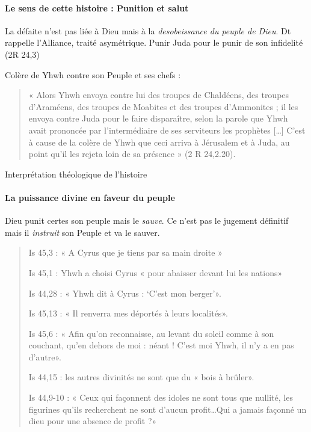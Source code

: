 \paragraph{Le sens de cette histoire : Punition et salut} La défaite n'est pas liée à  Dieu mais à la \textit{desobeissance du peuple de Dieu}. Dt rappelle l'Alliance, traité asymétrique. Punir Juda pour le punir de son infidelité (2R 24,3)

Colère de Yhwh contre son Peuple et ses chefs :
\begin{quote}
    « Alors Yhwh envoya contre lui des troupes de Chaldéens, des troupes d’Araméens, des troupes de
Moabites et des troupes d’Ammonites ; il les envoya contre Juda pour le faire disparaître, selon la
parole que Yhwh avait prononcée par l’intermédiaire de ses serviteurs les prophètes […] C’est à cause
de la colère de Yhwh que ceci arriva à Jérusalem et à Juda, au point qu’il les rejeta loin de sa
présence » (2 R 24,2.20).
\end{quote}

\begin{Synthesis}
Interprétation théologique de l'histoire
\end{Synthesis}


\paragraph{La puissance divine en faveur du peuple} Dieu punit certes son peuple mais le \textit{sauve}. Ce n'est pas le jugement définitif mais il \textit{instruit} son Peuple et va le sauver.

\begin{quote}
    Is 45,3 : « A Cyrus que je tiens par sa main droite »
    
Is 45,1 : Yhwh a choisi Cyrus « pour abaisser devant lui les nations»

Is 44,28 : « Yhwh dit à Cyrus : ‘C’est mon berger’».

Is 45,13 : « Il renverra mes déportés à leurs localités».

Is 45,6 : « Afin qu’on reconnaisse, au levant du soleil comme à son couchant, qu’en dehors de moi :
néant ! C’est moi Yhwh, il n’y a en pas d’autre».

Is 44,15 : les autres divinités ne sont que du « bois à brûler».

Is 44,9-10 : « Ceux qui façonnent des idoles ne sont tous que nullité, les figurines qu’ils recherchent
ne sont d’aucun profit…Qui a jamais façonné un dieu pour une absence de profit ?»
\end{quote}

